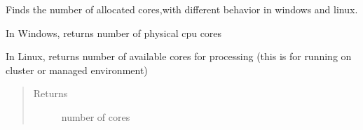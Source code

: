\documentclass[letterpaper,10pt,english]{sphinxmanual}
\begin{document}

\begin{fulllineitems}
\label{\detokenize{ppopt.utils:ppopt.utils.general_utils.num_cpu_cores}}
\sphinxAtStartPar
Finds the number of allocated cores,with different behavior in windows and linux.

\sphinxAtStartPar
In Windows, returns number of physical cpu cores

\sphinxAtStartPar
In Linux, returns number of available cores for processing (this is for running on cluster or managed environment)
\begin{quote}\begin{description}
\item[{Returns}] \leavevmode
\sphinxAtStartPar
number of cores

\end{description}\end{quote}

\end{fulllineitems}


\begin{fulllineitems}
\label{\detokenize{ppopt.utils:ppopt.utils.general_utils.ppopt_block}}
\end{fulllineitems}

\end{document}

